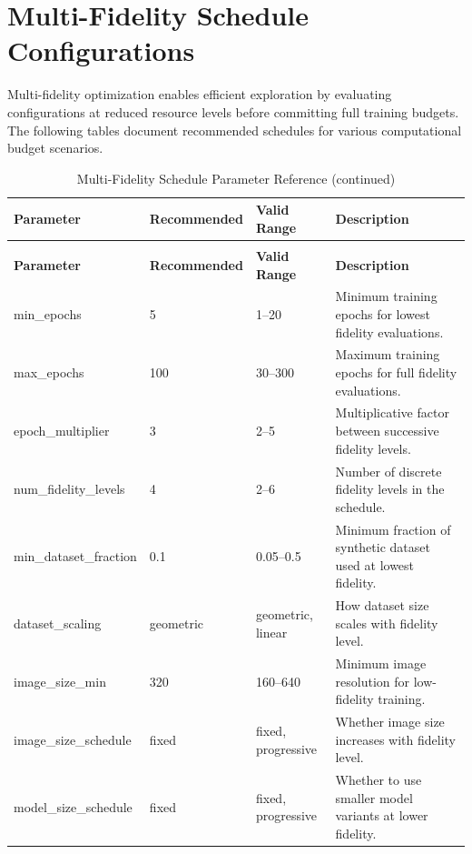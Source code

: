 \section{Multi-Fidelity Schedule Configurations}
\label{sec:multifidelity}

Multi-fidelity optimization enables efficient exploration by evaluating configurations at reduced resource levels before committing full training budgets. The following tables document recommended schedules for various computational budget scenarios.

\begin{longtable}{p{3.5cm}p{2cm}p{2.5cm}p{5.5cm}}
\caption{Multi-Fidelity Schedule Parameter Reference} \label{tab:multifidelity} \\
\toprule
\textbf{Parameter} & \textbf{Recommended} & \textbf{Valid Range} & \textbf{Description} \\
\midrule
\endfirsthead
\caption[]{Multi-Fidelity Schedule Parameter Reference (continued)} \\
\toprule
\textbf{Parameter} & \textbf{Recommended} & \textbf{Valid Range} & \textbf{Description} \\
\midrule
\endhead
\bottomrule
\endfoot
\bottomrule
\endlastfoot
min\_epochs & 5 & 1--20 & Minimum training epochs for lowest fidelity evaluations. \\
\addlinespace
max\_epochs & 100 & 30--300 & Maximum training epochs for full fidelity evaluations. \\
\addlinespace
epoch\_multiplier & 3 & 2--5 & Multiplicative factor between successive fidelity levels. \\
\addlinespace
num\_fidelity\_levels & 4 & 2--6 & Number of discrete fidelity levels in the schedule. \\
\addlinespace
min\_dataset\_fraction & 0.1 & 0.05--0.5 & Minimum fraction of synthetic dataset used at lowest fidelity. \\
\addlinespace
dataset\_scaling & geometric & geometric, linear & How dataset size scales with fidelity level. \\
\addlinespace
image\_size\_min & 320 & 160--640 & Minimum image resolution for low-fidelity training. \\
\addlinespace
image\_size\_schedule & fixed & fixed, progressive & Whether image size increases with fidelity level. \\
\addlinespace
model\_size\_schedule & fixed & fixed, progressive & Whether to use smaller model variants at lower fidelity. \\

\end{longtable}
